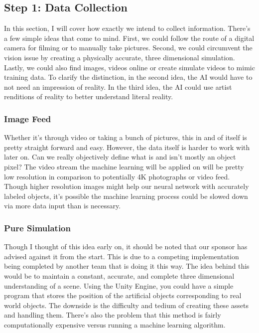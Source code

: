 \documentclass[10pt,journal,compsoc, draftclsnofoot,onecolumn]{IEEEtran}
\begin{document}
\subsection{Step 1: Data Collection}
In this section, I will cover how exactly we intend to collect information.
There's a few simple ideas that come to mind.
First, we could follow the route of a digital camera for filming or to manually take pictures.
Second, we could circumvent the vision issue by creating a physically accurate, three dimensional simulation.
Lastly, we could also find images, videos online or create simulate videos to mimic training data.
To clarify the distinction, in the second idea, the AI would have to not need an impression of reality.
In the third idea, the AI could use artist renditions of reality to better understand literal reality.

\subsubsection{Image Feed}
Whether it's through video or taking a bunch of pictures, this in and of itself is pretty straight forward and easy.
However, the data itself is harder to work with later on. Can we really objectively define what is and isn't mostly an object pixel?
The video stream the machine learning will be applied on will be pretty low resolution in comparison to potentially 4K photographs or video feed.
Though higher resolution images might help our neural network with accurately labeled objects, it's possible the machine learning process could be slowed down via more data input than is necessary.

\subsubsection{Pure Simulation}
Though I thought of this idea early on, it should be noted that our sponsor has advised against it from the start.
This is due to a competing implementation being completed by another team that is doing it this way.
The idea behind this would be to maintain a constant, accurate, and complete three dimensional understanding of a scene.
Using the Unity Engine, you could have a simple program that stores the position of the artificial objects corresponding to real world objects.
The downside is the difficulty and tedium of creating these assets and handling them.
There's also the problem that this method is fairly computationally expensive versus running a machine learning algorithm.
\end{document}
